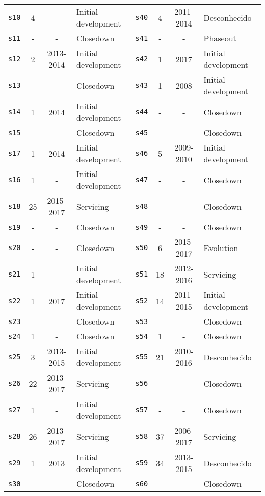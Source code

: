 \begin{longtable}{ l c c l | l c c l }
      \texttt{s10} & 4 & - & Initial development &
        \texttt{s40} & 4 & 2011-2014 & Desconhecido  \\
      \texttt{s11} & - & - & Closedown &
        \texttt{s41} & - & - & Phaseout  \\
      \texttt{s12} & 2 & 2013-2014 & Initial development &
        \texttt{s42} & 1 & 2017 & Initial development  \\
      \texttt{s13} & - & - & Closedown &
        \texttt{s43} & 1 & 2008 & Initial development  \\
      \texttt{s14} & 1 & 2014 & Initial development &
        \texttt{s44} & - & - & Closedown  \\
      \texttt{s15} & - & - & Closedown &
        \texttt{s45} & - & - & Closedown  \\
      \texttt{s17} & 1 & 2014 & Initial development &
        \texttt{s46} & 5 & 2009-2010 & Initial development  \\
      \texttt{s16} & 1 & - & Initial development &
        \texttt{s47} & - & - & Closedown  \\
      \texttt{s18} & 25 & 2015-2017 & Servicing &
        \texttt{s48} & - & - & Closedown  \\
      \texttt{s19} & - & - & Closedown &
        \texttt{s49} & - & - & Closedown  \\
      \texttt{s20} & - & - & Closedown &
        \texttt{s50} & 6 & 2015-2017 & Evolution  \\
      \texttt{s21} & 1 & - & Initial development &
        \texttt{s51} & 18 & 2012-2016 & Servicing  \\
      \texttt{s22} & 1 & 2017 & Initial development &
        \texttt{s52} & 14 & 2011-2015 & Initial development  \\
      \texttt{s23} & - & - & Closedown &
        \texttt{s53} & - & - & Closedown  \\
      \texttt{s24} & 1 & - & Closedown &
        \texttt{s54} & 1 & - & Closedown  \\
      \texttt{s25} & 3 & 2013-2015 & Initial development &
        \texttt{s55} & 21 & 2010-2016 & Desconhecido  \\
      \texttt{s26} & 22 & 2013-2017 & Servicing &
        \texttt{s56} & - & - & Closedown  \\
      \texttt{s27} & 1 & - & Initial development &
        \texttt{s57} & - & - & Closedown  \\
      \texttt{s28} & 26 & 2013-2017 & Servicing &
        \texttt{s58} & 37 & 2006-2017 & Servicing  \\
      \texttt{s29} & 1 & 2013 & Initial development &
        \texttt{s59} & 34 & 2013-2015 & Desconhecido  \\
      \texttt{s30} & - & - & Closedown &
        \texttt{s60} & - & - & Closedown  \\
\end{longtable}
